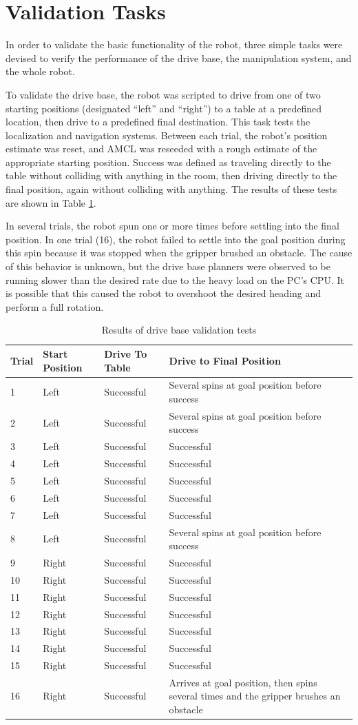 \documentclass[]{cwru} %
\begin{document}
\section{Validation Tasks}

In order to validate the basic functionality of the robot, three simple
tasks were devised to verify the performance of the drive base, the
manipulation system, and the whole robot.

To validate the drive base, the robot was scripted to drive from one of
two starting positions (designated ``left'' and ``right'') to a table at
a predefined location, then drive to a predefined final destination.
This task tests the localization and navigation systems. Between each
trial, the robot's position estimate was reset, and AMCL was reseeded
with a rough estimate of the appropriate starting position. Success was
defined as traveling directly to the table without colliding with
anything in the room, then driving directly to the final position, again
without colliding with anything. The results of these tests are shown in
Table \ref{tab:drive-validation}.

In several trials, the robot spun one or more times before settling into
the final position. In one trial (16), the robot failed to settle into
the goal position during this spin because it was stopped when the
gripper brushed an obstacle. The cause of this behavior is unknown, but
the drive base planners were observed to be running slower than the
desired rate due to the heavy load on the PC's CPU. It is possible that
this caused the robot to overshoot the desired heading and perform a
full rotation.

\begin{longtable}[c]{lllp{7.5cm}}
\caption{Results of drive base validation tests}
\label{tab:drive-validation}\tabularnewline
\endfirsthead
\toprule
\textbf{Trial} & \textbf{Start Position} & \textbf{Drive To Table} &
\textbf{Drive to Final Position}\tabularnewline
\midrule
1 & Left & Successful & Several spins at goal position before
success\tabularnewline
2 & Left & Successful & Several spins at goal position before
success\tabularnewline
3 & Left & Successful & Successful\tabularnewline
4 & Left & Successful & Successful\tabularnewline
5 & Left & Successful & Successful\tabularnewline
6 & Left & Successful & Successful\tabularnewline
7 & Left & Successful & Successful\tabularnewline
8 & Left & Successful & Several spins at goal position before
success\tabularnewline
9 & Right & Successful & Successful\tabularnewline
10 & Right & Successful & Successful\tabularnewline
11 & Right & Successful & Successful\tabularnewline
12 & Right & Successful & Successful\tabularnewline
13 & Right & Successful & Successful\tabularnewline
14 & Right & Successful & Successful\tabularnewline
15 & Right & Successful & Successful\tabularnewline
16 & Right & Successful & Arrives at goal position, then spins several
times and the gripper brushes an obstacle\tabularnewline
\bottomrule
\end{longtable}
\end{document}
